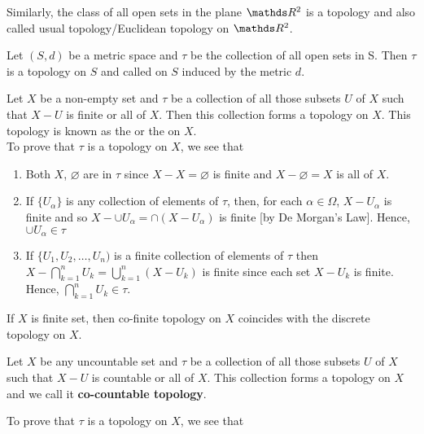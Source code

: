 \documentclass[../main-sheet.tex]{subfiles}
\begin{document}
Similarly, the class of all open sets in the plane  \(\R^2\) is a topology and also called usual topology/Euclidean topology on  \(\R^2\).
\begin{ex}
    Let  \((S,d)\) be a metric space and  \(\tau\) be the collection of all open sets in S. Then  \(\tau\) is a topology on  \(S\) and called  on  \(S\) induced by the metric  \(d\).
\end{ex}
\begin{ex}
    Let  \(X\) be a non-empty set and  \(\tau\) be a collection of all those subsets  \(U\) of  \(X\) such that  \(X - U\) is finite or all of  \(X\). Then this collection forms a topology on  \(X\). This topology is known as the  or the  on  \(X\).\\
    To prove that  \(\tau\) is a topology on  \(X\), we see that
    \begin{enumerate}[label=(\roman*)]
        \item  Both  \(X\),  \(\varnothing\) are in  \(\tau\) since  \(X-X = \varnothing\) is finite and  \(X - \varnothing = X\) is all of  \(X\).
        \item If  \(\{U_\alpha\}\) is any collection of elements of  \(\tau\), then, for each  \(\alpha \in \Omega\),  \(X - U_\alpha\) is finite and so  \(X-\cup U_\alpha=\cap (X - U_\alpha)\) is finite [by De Morgan's Law]. Hence,  \(\cup U_\alpha\in \tau\)
        \item If  \(\{U_1, U_2,\dots, U_n)\) is a finite collection of elements of  \(\tau\) then  \(\displaystyle X -\bigcap_{k=1}^n U_k = \bigcup_{k=1}^n (X - U_k)\) is finite since each set  \(X-U_k\) is finite. Hence,  \(\displaystyle \bigcap_{k=1}^n U_k\in \tau\).
    \end{enumerate}
\end{ex}
\begin{rem}
    If  \(X\) is finite set, then co-finite topology on  \(X\) coincides with the discrete topology on  \(X\).
\end{rem}
\begin{ex}
    Let  \(X\) be any uncountable set and  \(\tau\) be a collection of all those subsets  \(U\) of  \(X\) such that  \(X-U\) is countable or all of  \(X\). This collection forms a topology on  \(X\) and we call it \textbf{co-countable topology}.
\end{ex}
To prove that  \(\tau\) is a topology on  \(X\), we see that
\end{document}
